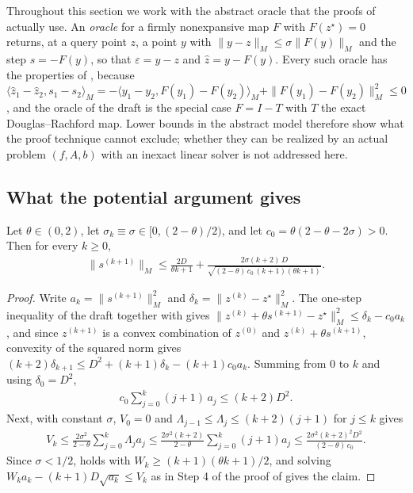Throughout this section we work with the abstract oracle that the proofs of  actually use.
An \emph{oracle} for a firmly nonexpansive map $F$ with $F(z^\star) = 0$ returns, at a query point $z$, a point $y$ with $\|y - z\|_M \le \sigma\|F(y)\|_M$ and the step $s = -F(y)$, so that $\varepsilon = y - z$ and $\hat z = y - F(y)$.
Every such oracle has the properties of , because $\langle \hat z_1 - \hat z_2, s_1 - s_2\rangle_M = -\langle y_1 - y_2, F(y_1) - F(y_2)\rangle_M + \|F(y_1) - F(y_2)\|_M^2 \le 0$, and the oracle of the draft is the special case $F = I - T$ with $T$ the exact Douglas--Rachford map.
Lower bounds in the abstract model therefore show what the proof technique cannot exclude; whether they can be realized by an actual problem $(f, A, b)$ with an inexact linear solver is not addressed here.

\subsection{What the potential argument gives}
\begin{proposition}\label{prop:acc-floor}
    Let $\theta \in (0,2)$, let $\sigma_k \equiv \sigma \in [0, (2-\theta)/2)$, and let $c_0 = \theta(2 - \theta - 2\sigma) > 0$.
    Then for every $k \ge 0$,
    \begin{align}
        \|s^{(k+1)}\|_M \le \frac{2D}{\theta k + 1} + \frac{2\sigma (k+2)\, D}{\sqrt{(2-\theta)\, c_0\, (k+1)(\theta k + 1)}} .
    \end{align}
\end{proposition}
\begin{proof}
    Write $a_k = \|s^{(k+1)}\|_M^2$ and $\delta_k = \|z^{(k)} - z^\star\|_M^2$.
    The one-step inequality of the draft together with  gives $\|z^{(k)} + \theta s^{(k+1)} - z^\star\|_M^2 \le \delta_k - c_0 a_k$, and since $z^{(k+1)}$ is a convex combination of $z^{(0)}$ and $z^{(k)} + \theta s^{(k+1)}$, convexity of the squared norm gives $(k+2)\delta_{k+1} \le D^2 + (k+1)\delta_k - (k+1)c_0 a_k$.
    Summing from $0$ to $k$ and using $\delta_0 = D^2$,
    \begin{align}
        c_0 \sum_{j=0}^{k}(j+1)\, a_j \le (k+2) D^2 . \label{eq:acc-fejer-sum}
    \end{align}
    Next,  with constant $\sigma$, $V_0 = 0$ and $\Lambda_{j-1} \le \Lambda_j \le (k+2)(j+1)$ for $j \le k$ gives
    \begin{align}
        V_k \le \frac{2\sigma^2}{2-\theta}\sum_{j=0}^{k}\Lambda_j a_j \le \frac{2\sigma^2 (k+2)}{2-\theta}\sum_{j=0}^{k}(j+1)a_j \le \frac{2\sigma^2 (k+2)^2 D^2}{(2-\theta)\, c_0} .
    \end{align}
    Since $\sigma < 1/2$,  holds with $W_k \ge (k+1)(\theta k+1)/2$, and solving $W_k a_k - (k+1)D\sqrt{a_k} \le V_k$ as in Step 4 of the proof of  gives the claim.
\end{proof}

